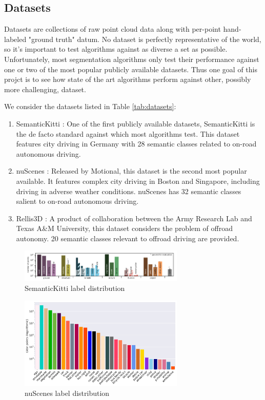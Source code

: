 \subsection{Datasets}
\label{sec:datasets}

Datasets are collections of raw point cloud data along with per-point hand-labeled "ground truth" datum. No dataset is perfectly representative of the world, so it's important to test algorithms against as diverse a set as possible. Unfortunately, most segmentation algorithms only test their performance against one or two of the most popular publicly available datasets. Thus one goal of this projct is to see how state of the art algorithms perform against other, possibly more challenging, dataset.

We consider the datasets listed in Table \ref{tab:datasets}:
\begin{enumerate}
  \item SemanticKitti \cite{semantickitti1,semantickitti2}: One of the first publicly available datasets, SemanticKitti is the de facto standard against which most algorithms test. This dataset features city driving in Germany with 28 semantic classes related to on-road autonomous driving.
  \item nuScenes \cite{nuscenes}: Released by Motional, this dataset is the second most popular available. It features complex city driving in Boston and Singapore, including driving in adverse weather conditions. nuScenes has 32 semantic classes salient to on-road autonomous driving.
  \item Rellis3D \cite{rellis3d}: A product of collaboration between the Army Research Lab and Texas A\&M University, this dataset considers the problem of offroad autonomy. 20 semantic classes relevant to offroad driving are provided.
\end{enumerate}

\begin{figure}[htp]
  \centering
  \includegraphics[width=0.7\textwidth]{images/semantic_kitti_label_distribution.png}
  \caption{SemanticKitti label distribution}
  \label{fig:semantickitti-label-distribution}
\end{figure}

\begin{figure}[htp]
  \centering
  \includegraphics[width=0.7\textwidth]{images/nuscenes_label_set.png}
  \caption{nuScenes label distribution}
  \label{fig:nuscenes-label-set}
\end{figure}

